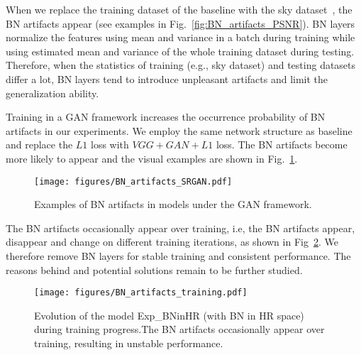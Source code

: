 \documentclass[runningheads]{llncs}
\begin{document}
When we replace the training dataset of the baseline with the sky dataset~\cite{wang2018sftgan}, the BN artifacts 
appear (see examples in Fig.~\ref{fig:BN_artifacts_PSNR}).
%
BN layers normalize the features using mean and variance in a batch during training while using estimated 
mean and variance of the whole training dataset during testing.
%
Therefore, when the statistics of training (e.g., sky dataset) and testing datasets differ a lot, BN layers tend to 
introduce unpleasant artifacts and limit the generalization ability.

Training in a GAN framework increases the occurrence probability of BN artifacts in our experiments. 
We employ the same network structure as baseline and replace the $L1$ loss with $VGG+GAN+L1$ loss.
The BN artifacts become more likely to appear and the visual examples are shown in Fig.~\ref{fig:BN_artifacts_SRGAN}.


\begin{figure}[htbp]
	\vspace{-0.4cm}
	\begin{center}
		\texttt{[image: figures/BN\_artifacts\_SRGAN.pdf]}
	\end{center}
	\vspace{-0.4cm}
	\caption{Examples of BN artifacts in models under the GAN framework.}
	\label{fig:BN_artifacts_SRGAN}
	\vspace{-0.4cm}
\end{figure}

The BN artifacts occasionally appear over training, i.e, the BN artifacts appear, disappear and change on different 
training iterations, as shown in Fig~\ref{fig:BN_artifacts_training}.
%
We therefore remove BN layers for stable training and consistent performance.
%
The reasons behind and potential solutions remain to be further studied.

\begin{figure}[htbp]
	\vspace{-0.4cm}
	\begin{center}
		\texttt{[image: figures/BN\_artifacts\_training.pdf]}
	\end{center}
	\vspace{-0.4cm}
	\caption{Evolution of the model Exp\_BNinHR (with BN in HR space) during training progress.The BN artifacts 
		occasionally appear over training, resulting in unstable  performance.}
	\vspace{-0.4cm}
	\label{fig:BN_artifacts_training}
\end{figure}
\end{document}
